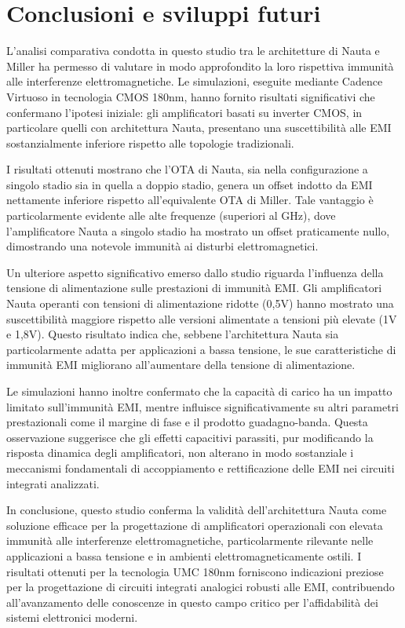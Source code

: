 \chapter{Conclusioni e sviluppi futuri}
\label{ch:conclusions}

L'analisi comparativa condotta in questo studio tra le architetture di Nauta e Miller ha permesso di valutare in modo approfondito la loro rispettiva immunità alle interferenze elettromagnetiche. Le simulazioni, eseguite mediante Cadence Virtuoso \textcopyright{} in tecnologia CMOS 180nm, hanno fornito risultati significativi che confermano l'ipotesi iniziale: gli amplificatori basati su inverter CMOS, in particolare quelli con architettura Nauta, presentano una suscettibilità alle EMI sostanzialmente inferiore rispetto alle topologie tradizionali.

I risultati ottenuti mostrano che l'OTA di Nauta, sia nella configurazione a singolo stadio sia in quella a doppio stadio, genera un offset indotto da EMI nettamente inferiore rispetto all'equivalente OTA di Miller. Tale vantaggio è particolarmente evidente alle alte frequenze (superiori al GHz), dove l'amplificatore Nauta a singolo stadio ha mostrato un offset praticamente nullo, dimostrando una notevole immunità ai disturbi elettromagnetici.

Un ulteriore aspetto significativo emerso dallo studio riguarda l'influenza della tensione di alimentazione sulle prestazioni di immunità EMI. Gli amplificatori Nauta operanti con tensioni di alimentazione ridotte (0,5V) hanno mostrato una suscettibilità maggiore rispetto alle versioni alimentate a tensioni più elevate (1V e 1,8V). Questo risultato indica che, sebbene l'architettura Nauta sia particolarmente adatta per applicazioni a bassa tensione, le sue caratteristiche di immunità EMI migliorano all'aumentare della tensione di alimentazione.

Le simulazioni hanno inoltre confermato che la capacità di carico ha un impatto limitato sull'immunità EMI, mentre influisce significativamente su altri parametri prestazionali come il margine di fase e il prodotto guadagno-banda. Questa osservazione suggerisce che gli effetti capacitivi parassiti, pur modificando la risposta dinamica degli amplificatori, non alterano in modo sostanziale i meccanismi fondamentali di accoppiamento e rettificazione delle EMI nei circuiti integrati analizzati.

In conclusione, questo studio conferma la validità dell'architettura Nauta come soluzione efficace per la progettazione di amplificatori operazionali con elevata immunità alle interferenze elettromagnetiche, particolarmente rilevante nelle applicazioni a bassa tensione e in ambienti elettromagneticamente ostili. I risultati ottenuti per la tecnologia UMC 180nm forniscono indicazioni preziose per la progettazione di circuiti integrati analogici robusti alle EMI, contribuendo all'avanzamento delle conoscenze in questo campo critico per l'affidabilità dei sistemi elettronici moderni.

